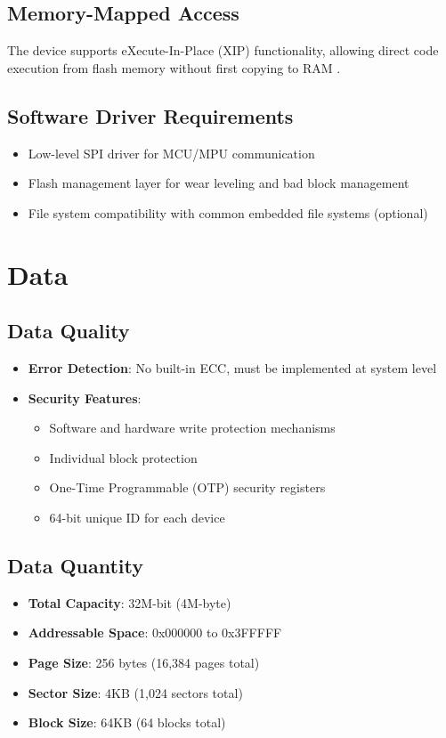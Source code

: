 \subsection{Memory-Mapped Access}
The device supports eXecute-In-Place (XIP) functionality, allowing direct code execution from flash memory without first copying to RAM \cite{Jotrin:2018}.

\subsection{Software Driver Requirements}
\begin{itemize}
	\item Low-level SPI driver for MCU/MPU communication
	\item Flash management layer for wear leveling and bad block management
	\item File system compatibility with common embedded file systems (optional) \cite{Winbond:2016}
\end{itemize}

\section{Data}

\subsection{Data Quality}
\begin{itemize}
	\item \textbf{Error Detection}: No built-in ECC, must be implemented at system level
	\item \textbf{Security Features}:
	\begin{itemize}
		\item Software and hardware write protection mechanisms
		\item Individual block protection
		\item One-Time Programmable (OTP) security registers
		\item 64-bit unique ID for each device \cite{Winbond:2016}
	\end{itemize}
\end{itemize}

\subsection{Data Quantity}
\begin{itemize}
	\item \textbf{Total Capacity}: 32M-bit (4M-byte)
	\item \textbf{Addressable Space}: 0x000000 to 0x3FFFFF
	\item \textbf{Page Size}: 256 bytes (16,384 pages total)
	\item \textbf{Sector Size}: 4KB (1,024 sectors total)
	\item \textbf{Block Size}: 64KB (64 blocks total) \cite{Winbond:2016}
\end{itemize}

